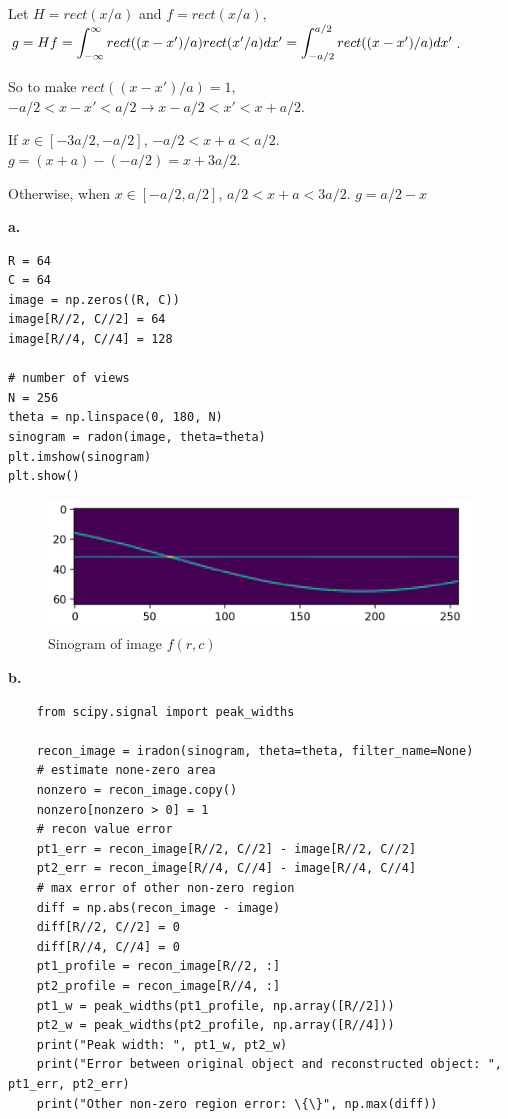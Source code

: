 \documentclass[11pt,a4paper]{article}
\begin{document}
\newpage
{}
Let $H=rect(x/a)$ and $f=rect(x/a)$,\\
$g=Hf=\bint{-\infty}{\infty}rect((x-x')/a)rect(x'/a)dx'=\bint{-a/2}{a/2}rect((x-x')/a)dx'$.
 
So to make $rect((x-x')/a)=1$, $-a/2<x-x'<a/2\rightarrow x-a/2<x'<x+a/2$. 

If $x\in [-3a/2, -a/2]$, $-a/2<x+a<a/2$. $g=(x+a)-(-a/2)=x+3a/2$. 

Otherwise, when $x\in[-a/2,a/2]$, $a/2<x+a<3a/2$. $g=a/2-x$

\newpage
{}
\textbf{a.}

\begin{lstlisting}
R = 64
C = 64
image = np.zeros((R, C))
image[R//2, C//2] = 64
image[R//4, C//4] = 128

# number of views
N = 256
theta = np.linspace(0, 180, N)
sinogram = radon(image, theta=theta)
plt.imshow(sinogram)
plt.show()
\end{lstlisting}

\begin{figure}[!ht]
    \centering
    \includegraphics[width=\linewidth]{HW2_Q3_1.png}
    \caption{Sinogram of image $f(r,c)$}
\end{figure}

\textbf{b.}

\begin{lstlisting}
    from scipy.signal import peak_widths

    recon_image = iradon(sinogram, theta=theta, filter_name=None)
    # estimate none-zero area
    nonzero = recon_image.copy()
    nonzero[nonzero > 0] = 1
    # recon value error 
    pt1_err = recon_image[R//2, C//2] - image[R//2, C//2]
    pt2_err = recon_image[R//4, C//4] - image[R//4, C//4]
    # max error of other non-zero region 
    diff = np.abs(recon_image - image)
    diff[R//2, C//2] = 0
    diff[R//4, C//4] = 0
    pt1_profile = recon_image[R//2, :]
    pt2_profile = recon_image[R//4, :]
    pt1_w = peak_widths(pt1_profile, np.array([R//2]))
    pt2_w = peak_widths(pt2_profile, np.array([R//4]))
    print("Peak width: ", pt1_w, pt2_w)
    print("Error between original object and reconstructed object: ", pt1_err, pt2_err)
    print("Other non-zero region error: \{\}", np.max(diff))
    \end{lstlisting}
\end{document}
